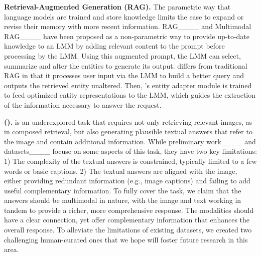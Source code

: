 \noindent\textbf{Retrieval-Augmented Generation (RAG).}
The parametric way that language models are trained and store knowledge limits the ease to expand or revise their memory with more recent information.
RAG____ and Multimodal RAG____ have been proposed as a non-parametric way to provide up-to-date knowledge to an LMM by adding relevant content to the prompt before processing by the LMM.
Using this augmented prompt, the LMM can select, summarize and alter the entities to generate its output.
\modelname differs from traditional RAG in that it processes user input via the LMM to build a better query and outputs the retrieved entity unaltered.
Then, \modelname's entity adapter module is trained to feed optimized entity representations to the LMM, which guides the extraction of the information necessary to answer the request.
%
%
%
%
%
%
%



\noindent\textbf{\tasknametitle (\tasknameshort).}
\tasknameshort is an underexplored task that requires not only retrieving relevant images, as in composed retrieval, but also generating plausible textual answers that refer to the image and contain additional information.
While preliminary work____ and datasets____ focuse on some aspects of this task, they have two key limitations: 
1) The complexity of the textual answers is constrained, typically limited to a few words or basic captions.
2) The textual answers are aligned with the image, either providing redundant information (e.g., image captions) and failing to add useful complementary information.
To fully cover the \tasknameshort task, we claim that the answers should be multimodal in nature, with the image and text working in tandem to provide a richer, more comprehensive response.
The modalities should have a clear connection, yet offer complementary information that enhances the overall response.
To alleviate the limitations of existing \tasknameshort datasets, we created two challenging human-curated ones that we hope will foster future research in this area.